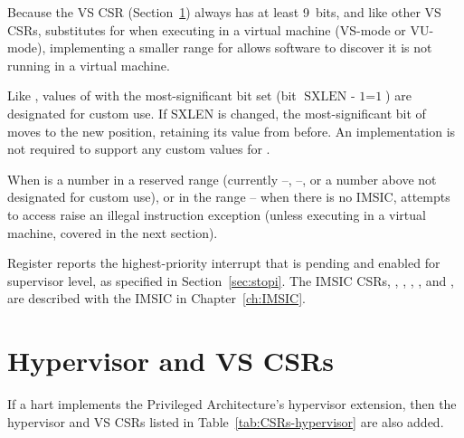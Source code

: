 \begin{commentary}
Because the VS CSR  (Section~\ref{ch:CSRs-hypervisor})
always has at least 9~bits, and like other VS CSRs, 
substitutes for  when executing in a virtual machine
(\mbox{VS-mode} or \mbox{VU-mode}), implementing a smaller range for
 allows software to discover it is not running in a virtual
machine.
\end{commentary}

Like , values of  with the most-significant bit
set (bit $\mbox{SXLEN - 1} = \mbox{1}$) are designated for custom use.
If SXLEN is changed, the most-significant bit of  moves to
the new position, retaining its value from before.
An implementation is not required to support any custom values for
.

When  is a number in a reserved range (currently
--, --, or a number above 
not designated for custom use), or in the range --
when there is no IMSIC, attempts to access  raise an illegal
instruction exception (unless executing in a virtual machine, covered
in the next section).

Register  reports the highest-priority interrupt that
is pending and enabled for supervisor level, as specified in
Section~\ref{sec:stopi}.
The IMSIC CSRs, , , ,
, and , are described with the IMSIC in
Chapter~\ref{ch:IMSIC}.

\section{Hypervisor and VS CSRs}
\label{ch:CSRs-hypervisor}

If a hart implements the Privileged Architecture's hypervisor
extension, then the hypervisor and VS CSRs listed in
Table~\ref{tab:CSRs-hypervisor} are also added.


